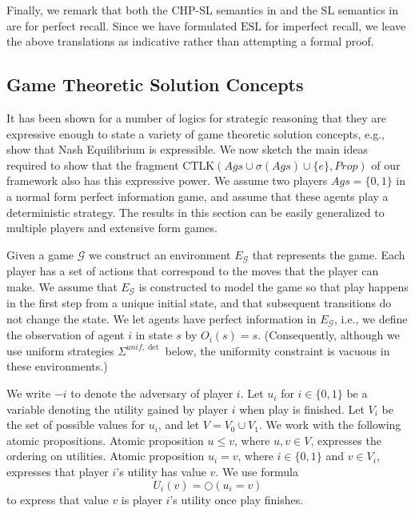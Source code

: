 \documentclass[a4wide]{article}
\newcommand{\CTLK}{\mbox{CTLK}}
\newcommand{\ESL}{\mbox{ESL}}
\theoremstyle{examplesty}
\newcommand{\strat}{\sigma}
\newcommand{\Ags}{\mathit{Ags}}
\newcommand{\Env}{E}
\newcommand{\nxt}{\Circle}
\newcommand{\unif}{\mathit{unif}}
\newcommand{\Strats}{\Sigma}
\begin{document}
Finally, we remark that both the CHP-SL semantics in \cite{CHP10}  and the SL semantics in \cite{MogaveroMV10}  are  for perfect recall. 
Since we have formulated $\ESL$ for imperfect recall, we leave the above translations as indicative rather than attempting a formal proof.  



 
\subsection{Game Theoretic Solution Concepts}\label{sec:games} 
 
It has been shown for a number of logics for strategic reasoning that they are expressive enough
to state a variety of game theoretic solution concepts, e.g.,  \cite{CATL,CHP10} show that Nash Equilibrium is expressible. 
We  now sketch the main ideas required to show that the fragment $\CTLK(\Ags\cup \strat(\Ags)\cup \{e\}, 
Prop)$ of 
our framework also has this expressive power. We assume two players $\Ags=\{0,1\}$ in a normal form 
perfect information 
game, 
and assume that these agents play a deterministic strategy. 
The results in this section can be easily generalized to multiple players and extensive form games. 


Given a game $\mathcal{ G}$ we construct an environment $\Env_\mathcal{ G}$ that represents the game. 
Each player has a set of actions that correspond to the moves that the player can make. 
We assume that  $\Env_\mathcal{ G}$ is constructed to model the game so that play happens in the first step from a 
unique initial state,  and that subsequent transitions do not change the state. 
We let agents have perfect information in $E_\mathcal{ G}$, i.e., we define the observation of agent $i$ in state $s$ 
by $O_i(s) = s$. (Consequently, although we use uniform strategies $\Strats^{\unif,\det}$ below, the uniformity constraint 
is vacuous in these environments.) 

We write  $-i$ to denote the adversary of player $i$. 
Let $u_i$ for $i\in\{0,1\}$ be a variable denoting the utility gained by player $i$ when play is finished. 
Let $V_i$ be the set of possible values for $u_i$, 
and let $V = V_0\cup V_1$. 
We work with the following atomic propositions. 
Atomic proposition $u\leq v$, where $u,v\in V$, expresses 
the ordering on utilities. 
Atomic proposition $u_i =v$, where $i\in \{0,1\}$ and $v\in V_i$, expresses that 
player $i$'s utility has value $v$. 
We use formula  $$U_i(v)= \nxt(u_i=v)$$
to express that value $v$ is player $i$'s utility once play finishes.  
\end{document}
